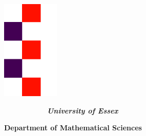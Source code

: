 \documentclass[12pt, a4paper,oneside]{book}
\numberwithin{equation}{section}
\begin{document}
\thispagestyle{empty}

\begin{minipage}{0.2\textwidth}
\centerline{\includegraphics[width=.4\textwidth]{essex} }
\end{minipage}
\begin{minipage}{0.8\textwidth}

$ \qquad \qquad \qquad ${\LARGE \bf \sl University of Essex}

{\LARGE \bf Department of Mathematical Sciences}

\end{minipage}
\end{document}
